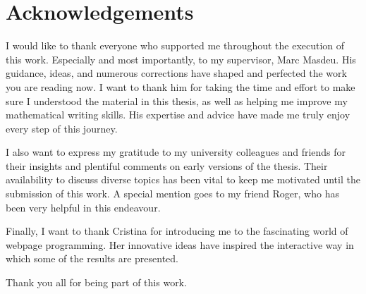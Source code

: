 \documentclass[../main.tex]{subfiles}
\begin{document}
\section*{Acknowledgements}

I would like to thank everyone who supported me throughout the execution of this work. Especially and most importantly, to my supervisor, Marc Masdeu. His guidance, ideas, and numerous corrections have shaped and perfected the work you are reading now. I want to thank him for taking the time and effort to make sure I understood the material in this thesis, as well as helping me improve my mathematical writing skills. His expertise and advice have made me truly enjoy every step of this journey.

I also want to express my gratitude to my university colleagues and friends for their insights and plentiful comments on early versions of the thesis. Their availability to discuss diverse topics has been vital to keep me motivated until the submission of this work. A special mention goes to my friend Roger, who has been very helpful in this endeavour.

Finally, I want to thank Cristina for introducing me to the fascinating world of webpage programming. Her innovative ideas have inspired the interactive way in which some of the results are presented.

Thank you all for being part of this work.
\end{document}
